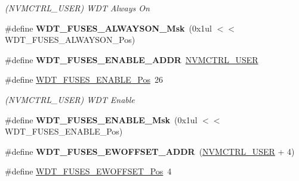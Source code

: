 \begin{DoxyCompactItemize}
\begin{DoxyCompactList}\small\item\em (N\+V\+M\+C\+T\+R\+L\+\_\+\+U\+S\+E\+R) W\+D\+T Always On \end{DoxyCompactList}\item 
\hypertarget{group__fuses__api_ga05c6f0eb24d3052a4741e4ac15f4eba7}{}\#define {\bfseries W\+D\+T\+\_\+\+F\+U\+S\+E\+S\+\_\+\+A\+L\+W\+A\+Y\+S\+O\+N\+\_\+\+Msk}~(0x1ul $<$$<$ W\+D\+T\+\_\+\+F\+U\+S\+E\+S\+\_\+\+A\+L\+W\+A\+Y\+S\+O\+N\+\_\+\+Pos)\label{group__fuses__api_ga05c6f0eb24d3052a4741e4ac15f4eba7}

\item 
\hypertarget{group__fuses__api_gae27b2582fb347f81b42d4722e93c19eb}{}\#define {\bfseries W\+D\+T\+\_\+\+F\+U\+S\+E\+S\+\_\+\+E\+N\+A\+B\+L\+E\+\_\+\+A\+D\+D\+R}~\hyperlink{group___s_a_m_l21_j18_a__base_ga7a7a83a5753fa323b61536e396083c99}{N\+V\+M\+C\+T\+R\+L\+\_\+\+U\+S\+E\+R}\label{group__fuses__api_gae27b2582fb347f81b42d4722e93c19eb}

\item 
\hypertarget{group__fuses__api_ga3e49258fa52a7aededcc7b3e54533ef5}{}\#define \hyperlink{group__fuses__api_ga3e49258fa52a7aededcc7b3e54533ef5}{W\+D\+T\+\_\+\+F\+U\+S\+E\+S\+\_\+\+E\+N\+A\+B\+L\+E\+\_\+\+Pos}~26\label{group__fuses__api_ga3e49258fa52a7aededcc7b3e54533ef5}

\begin{DoxyCompactList}\small\item\em (N\+V\+M\+C\+T\+R\+L\+\_\+\+U\+S\+E\+R) W\+D\+T Enable \end{DoxyCompactList}\item 
\hypertarget{group__fuses__api_ga7321a6dde7b33a36af18c07c65c6a55e}{}\#define {\bfseries W\+D\+T\+\_\+\+F\+U\+S\+E\+S\+\_\+\+E\+N\+A\+B\+L\+E\+\_\+\+Msk}~(0x1ul $<$$<$ W\+D\+T\+\_\+\+F\+U\+S\+E\+S\+\_\+\+E\+N\+A\+B\+L\+E\+\_\+\+Pos)\label{group__fuses__api_ga7321a6dde7b33a36af18c07c65c6a55e}

\item 
\hypertarget{group__fuses__api_ga04fb0607afaf725d76bd4205ea0d4f94}{}\#define {\bfseries W\+D\+T\+\_\+\+F\+U\+S\+E\+S\+\_\+\+E\+W\+O\+F\+F\+S\+E\+T\+\_\+\+A\+D\+D\+R}~(\hyperlink{group___s_a_m_l21_j18_a__base_ga7a7a83a5753fa323b61536e396083c99}{N\+V\+M\+C\+T\+R\+L\+\_\+\+U\+S\+E\+R} + 4)\label{group__fuses__api_ga04fb0607afaf725d76bd4205ea0d4f94}

\item 
\hypertarget{group__fuses__api_gae2f89f15eabc293811402651af74d059}{}\#define \hyperlink{group__fuses__api_gae2f89f15eabc293811402651af74d059}{W\+D\+T\+\_\+\+F\+U\+S\+E\+S\+\_\+\+E\+W\+O\+F\+F\+S\+E\+T\+\_\+\+Pos}~4\label{group__fuses__api_gae2f89f15eabc293811402651af74d059}


\end{DoxyCompactItemize}
